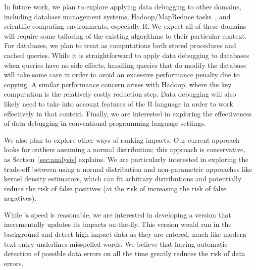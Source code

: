 In future work, we plan to explore applying data debugging to other
domains, including database management systems, Hadoop/MapReduce
tasks~\cite{dean2008mapreduce,hadoop}, and scientific computing environments, especially R. We expect
all of these domains will require some tailoring of the existing
algorithms to their particular context. For databases, we plan to
treat as computations both stored procedures and cached queries. While
it is straightforward to apply data debugging to databases when
queries have no side effects, handling queries that do modify the
database will take some care in order to avoid an excessive
performance penalty due to copying. A similar performance concern
arises with Hadoop, where the key computation is the relatively costly
reduction step. Data debugging will also likely need to take into
account features of the R language in order to work effectively in
that context. Finally, we are interested in exploring the
effectiveness of data debugging in conventional programming language
settings.

We also plan to explore other ways of ranking impacts. Our current
approach looks for outliers assuming a normal distribution; this
approach is conservative, as Section~\ref{sec:analysis} explains. We
are particularly interested in exploring the trade-off between using a
normal distribution and non-parametric approaches like kernel
density estimators, which can fit arbitrary distributions and
potentially reduce the risk of false positives (at the risk of
increasing the risk of false negatives).

While \checkcell{}'s speed is reasonable, we are interested in
developing a version that incrementally updates its impacts
on-the-fly. This version would run in the background and detect high
impact data as they are entered, much like modern text entry
underlines misspelled words. We believe that having automatic
detection of possible data errors on all the time greatly reduces
the risk of data errors.
